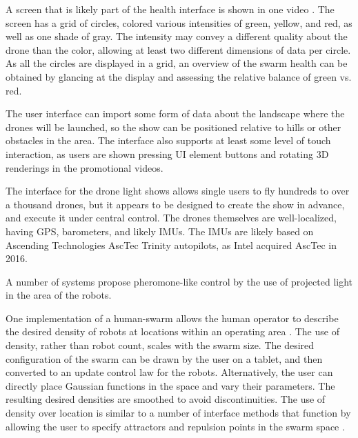 A screen that is likely part of the health interface is shown in one video \citep{OlympicTech}.
The screen has a grid of circles, colored various intensities of green, yellow, and red, as well as one shade of gray. 
The intensity may convey a different quality about the drone than the color, allowing at least two different dimensions of data per circle. 
As all the circles are displayed in a grid, an overview of the swarm health can be obtained by glancing at the display and assessing the relative balance of green vs. red. 

The user interface can import some form of data about the landscape where the drones will be launched, so the show can be positioned relative to hills or other obstacles in the area. 
The interface also supports at least some level of touch interaction, as users are shown pressing UI element buttons and rotating 3D renderings in the promotional videos. 

The interface for the drone light shows allows single users to fly hundreds to over a thousand drones, but it appears to be designed to create the show in advance, and execute it under central control. 
The drones themselves are well-localized, having GPS, barometers, and likely IMUs. 
The IMUs are likely based on Ascending Technologies AscTec Trinity autopilots, as Intel acquired AscTec in 2016. 

A number of systems propose pheromone-like control by the use of projected light in the area of the robots. 


One implementation of a human-swarm allows the human operator to describe the desired density of robots at locations within an operating area \citep{diaz2017human}. 
The use of density, rather than robot count, scales with the swarm size.
The desired configuration of the swarm can be drawn by the user on a tablet, and then converted to an update control law for the robots.
Alternatively, the user can directly place Gaussian functions in the space and vary their parameters. 
The resulting desired densities are smoothed to avoid discontinuities.
The use of density over location is similar to a number of interface methods that function by allowing the user to specify attractors and repulsion points in the swarm space \citep{goodrich2011toward, brown2014human, vasile2011integrating, kira2009exerting}. 

